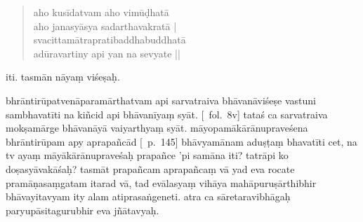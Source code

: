 \documentclass[12pt]{article}
\begin{document}
\begin{quote}
	aho kusīdatvam aho vimūḍhatā\\
	aho janasyāsya sadarthavakratā |\\
	svacittamātrapratibaddhabuddhatā\footnoteB{
		°pratibaddha°] \conj\ (\TIB; 'brel pa); °pratibuddha° \MS\ \EDD
	}\\
	adūravartiny api yan na sevyate ||
% 
% 
% 
\end{quote}

\noindent iti. tasmān nāyaṃ viśeṣaḥ.

bhrāntirūpatvenāparamārthatvam api sarvatraiva bhāvanāviśeṣe vastuni sambhavatīti na kiñcid api bhāvanīyaṃ syāt. [\MS\ fol.\ 8v] tataś ca sarvatraiva mokṣamārge bhāvanāyā vaiyarthyaṃ syāt. māyopamākārānupraveśena bhrāntirūpam apy aprapañcād [\EDD\ p.\ 145] bhāvyamānam\footnoteB{
	aprapañcād bhāvyamānam] \EDD ; aprapañcā bhāvyamāṇam
} aduṣṭaṃ bhavatīti cet, na tv ayaṃ māyākārānupraveśaḥ prapañce 'pi samāna iti? tatrāpi ko doṣasyāvakāśaḥ? tasmāt prapañcam aprapañcaṃ vā yad eva rocate pramāṇasaṃgatam itarad vā, tad evālasyaṃ vihāya mahāpuruṣārthibhir bhāvayitavyam\footnoteB{
	bhāvayitavyam] \EDD ; bhaviyitavyam \MS
} ity alam atiprasaṅgeneti. atra ca sāretaravibhāgaḥ paryupāsitagurubhir eva jñātavyaḥ.
\end{document}
